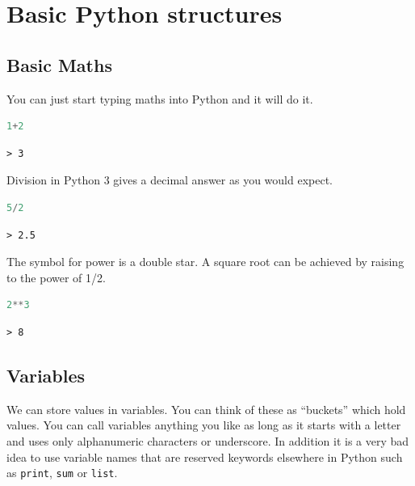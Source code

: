 \section{Basic Python structures}
	\subsection{Basic Maths}
You can just start typing maths into Python and it will do it.
		\begin{lstlisting}[language=Python]
1+2\end{lstlisting}
		\begin{verbatim}> 3\end{verbatim}
		
Division in Python 3 gives a decimal answer as you would expect.
		\begin{lstlisting}[language=Python]
5/2\end{lstlisting}
		\begin{verbatim}> 2.5\end{verbatim}
		
		The symbol for power is a double star. A square root can be achieved by raising to the power of 1/2.
		\begin{lstlisting}[language=Python]
2**3\end{lstlisting}
		\begin{verbatim}> 8\end{verbatim}

	\subsection{Variables}\label{types}
		We can store values in variables. You can think of these as ``buckets'' which hold values. You can call variables anything you like as long as it starts with a letter and uses only alphanumeric characters or underscore. In addition it is a very bad idea to use variable names that are reserved keywords elsewhere in Python such as \texttt{print}, \texttt{sum} or \texttt{list}.

